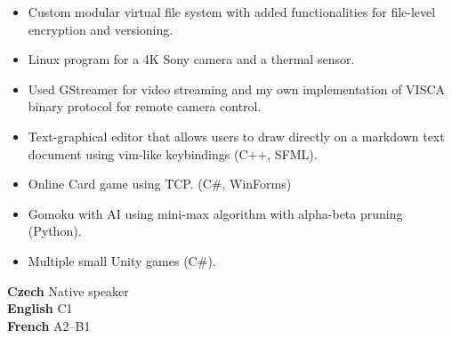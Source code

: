 

\begin{itemize}
\item Custom modular virtual file system with added functionalities for file-level encryption and versioning.
\end{itemize}

\vspace{4px}


\begin{itemize}
\item Linux program for a 4K Sony camera and a thermal sensor. 
\item Used GStreamer for video streaming and my own implementation of VISCA binary protocol  for remote camera control.
\end{itemize}

\vspace{4px}


\begin{itemize}
\item Text-graphical editor that allows users to draw directly on a markdown text document using vim-like keybindings (C++, SFML).
\item Online Card game using TCP. (C\#, WinForms) 
\item Gomoku with AI using mini-max algorithm with alpha-beta pruning (Python).
\item Multiple small Unity games (C\#).
\end{itemize}

\vspace{8px}

\textbf{ Czech} \hfill Native speaker \\
\textbf{ English} \hfill C1 \\
\textbf{ French} \hfill A2--B1




